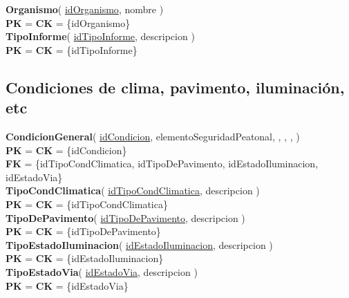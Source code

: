 \textbf{Organismo}(
    \uline{idOrganismo},
    nombre
)\\
\textbf{PK} = \textbf{CK} = \{idOrganismo\}\\

\textbf{TipoInforme}(
    \uline{idTipoInforme},
    descripcion
)\\
\textbf{PK} = \textbf{CK} = \{idTipoInforme\}\\


\subsection{Condiciones de clima, pavimento, iluminación, etc}

\textbf{CondicionGeneral}(
    \uline{idCondicion},
    elementoSeguridadPeatonal,
    ,
    ,
    ,
)\\
\textbf{PK} = \textbf{CK} = \{idCondicion\}\\
\textbf{FK} = \{idTipoCondClimatica, idTipoDePavimento, idEstadoIluminacion, idEstadoVia\}\\


\textbf{TipoCondClimatica}(
    \uline{idTipoCondClimatica},
    descripcion
)\\
\textbf{PK} = \textbf{CK} =  \{idTipoCondClimatica\}\\

\textbf{TipoDePavimento}(
    \uline{idTipoDePavimento},
    descripcion
)\\
\textbf{PK} = \textbf{CK} = \{idTipoDePavimento\}\\

\textbf{TipoEstadoIluminacion}(
    \uline{idEstadoIluminacion},
    descripcion
)\\
\textbf{PK} = \textbf{CK} = \{idEstadoIluminacion\}\\

\textbf{TipoEstadoVia}(
    \uline{idEstadoVia},
    descripcion
)\\
\textbf{PK} = \textbf{CK} = \{idEstadoVia\}\\
